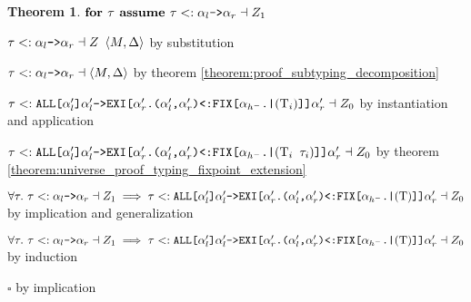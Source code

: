 \documentclass[acmsmall]{acmart}
\theoremstyle{definition}
\newtheorem{theorem}{Theorem}[section]
\begin{document}
\begin{theorem}
    \item \Z\Z $\textbf{for } \tau \textbf{ assume }
      \tau <: \texttt{$\alpha_l$->$\alpha_r$} \dashv Z_1
    $
      \item \Z\Z\Z $
        \tau <: \texttt{$\alpha_l$->$\alpha_r$} \dashv Z\ \left<M, \Delta\right>
      $ by substitution

      \item \Z\Z\Z $
        \tau <: \texttt{$\alpha_l$->$\alpha_r$} \dashv\left<M, \Delta\right>
      $ by theorem \ref{theorem:proof_subtyping_decomposition}

      \item \Z\Z\Z $
        \tau
        <:
        \texttt{ALL[$\alpha_l'$]$\alpha_l'$->EXI[$\alpha_r'$.($\alpha_l'$,$\alpha_r'$)<:FIX[$\alpha_{h^-}$.|$(\mathrm{T}_i)$]]$\alpha_r'$} 
        \dashv Z_0
      $ by instantiation and application 
      \item \Z\Z\Z $
        \tau
        \subtypes
        \code{ALL[$\alpha_l'$]$\alpha_l'$->EXI[$\alpha_r'$.($\alpha_l'$,$\alpha_r'$)<:FIX[$\alpha_{h^-}$.|$(\Tau_i\ \tau_i)$]]$\alpha_r'$} 
        \given Z_0
      $ by theorem \ref{theorem:universe_proof_typing_fixpoint_extension}
    \item \Z\Z $
      \forall \tau .\ 
      \tau \subtypes \code{$\alpha_l$->$\alpha_r$} \given Z_1
      \implies
      \tau
      \subtypes
      \code{ALL[$\alpha_l'$]$\alpha_l'$->EXI[$\alpha_r'$.($\alpha_l'$,$\alpha_r'$)<:FIX[$\alpha_{h^-}$.|$(\Tau)$]]$\alpha_r'$} 
      \given Z_0
    $ by implication and generalization 


  \item \Z $
    \forall \tau .\ 
    \tau \subtypes \code{$\alpha_l$->$\alpha_r$} \given Z_1
    \implies
    \tau
    \subtypes
    \code{ALL[$\alpha_l'$]$\alpha_l'$->EXI[$\alpha_r'$.($\alpha_l'$,$\alpha_r'$)<:FIX[$\alpha_{h^-}$.|$(\Tau)$]]$\alpha_r'$} 
    \given Z_0
  $ by induction
  \item $\square$ by implication
\end{theorem}
\end{document}
